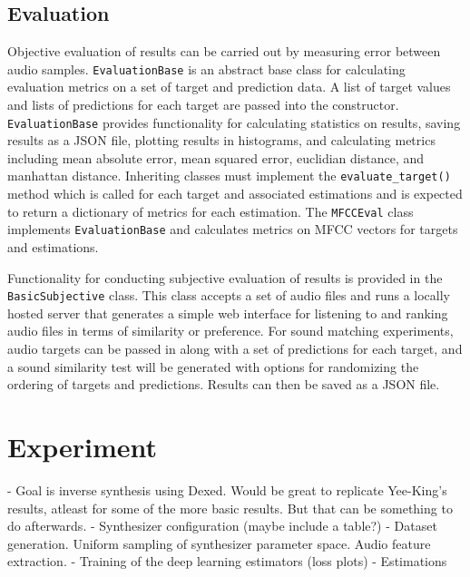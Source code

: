 \subsection{Evaluation}
Objective evaluation of results can be carried out by measuring error between audio samples. \texttt{EvaluationBase} is an abstract base class for calculating evaluation metrics on a set of target and prediction data. A list of target values and lists of predictions for each target are passed into the constructor. \texttt{EvaluationBase} provides functionality for calculating statistics on results, saving results as a JSON file, plotting results in histograms, and calculating metrics including mean absolute error, mean squared error, euclidian distance, and manhattan distance. Inheriting classes must implement the \texttt{evaluate_target()} method which is called for each target and associated estimations and is expected to return a dictionary of metrics for each estimation. The \texttt{MFCCEval} class implements \texttt{EvaluationBase} and calculates metrics on MFCC vectors for targets and estimations.

Functionality for conducting subjective evaluation of results is provided in the \texttt{BasicSubjective} class. This class accepts a set of audio files and runs a locally hosted server that generates a simple web interface for listening to and ranking audio files in terms of similarity or preference. For sound matching experiments, audio targets can be passed in along with a set of predictions for each target, and a sound similarity test will be generated with options for randomizing the ordering of targets and predictions. Results can then be saved as a JSON file.

\section{Experiment}
\label{chapter:inverse_synth;section:experiment}

- Goal is inverse synthesis using Dexed. Would be great to replicate Yee-King's results, atleast for some of the more basic results. But that can be something to do afterwards.
- Synthesizer configuration (maybe include a table?)
- Dataset generation. Uniform sampling of synthesizer parameter space. Audio feature extraction.
- Training of the deep learning estimators (loss plots)
- Estimations

